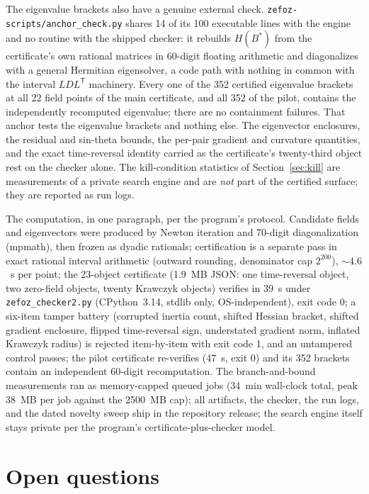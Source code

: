 \documentclass[11pt]{amsart}
\theoremstyle{plain}
\theoremstyle{definition}
\theoremstyle{remark}
\begin{document}
The eigenvalue brackets also have a genuine external check.
\texttt{zefoz-scripts/anchor\_check.py} shares 14 of its 100 executable
lines with the engine and no routine with the shipped checker: it rebuilds
$H(B^{*})$ from the certificate's own rational matrices in 60-digit
floating arithmetic and diagonalizes with a general Hermitian eigensolver,
a code path with nothing in common with the interval $LDL^{\mathsf T}$ machinery.
Every one of the 352 certified eigenvalue brackets at all 22 field points
of the main certificate, and all 352 of the pilot, contains the
independently recomputed eigenvalue; there are no containment failures.
That anchor tests the eigenvalue brackets and nothing else. The
eigenvector enclosures, the residual and sin-theta bounds, the per-pair
gradient and curvature quantities, and the exact time-reversal identity
carried as the certificate's twenty-third object rest on the checker
alone.  The kill-condition statistics of
Section~\ref{sec:kill} are measurements of a private search engine and are
\emph{not} part of the certified surface; they are reported as run logs.

The computation, in one paragraph, per the program's protocol.  Candidate
fields and eigenvectors were produced by Newton iteration and 70-digit
diagonalization (mpmath), then frozen as dyadic rationals; certification is a
separate pass in exact rational interval arithmetic (outward rounding,
denominator cap $2^{200}$), $\sim4.6$~s per point; the 23-object certificate
(1.9~MB JSON: one time-reversal object, two zero-field objects, twenty
Krawczyk objects) verifies in $39$~s under \texttt{zefoz\_checker2.py}
(CPython~3.14, stdlib only, OS-independent), exit code 0; a six-item tamper
battery (corrupted inertia count, shifted Hessian bracket, shifted gradient
enclosure, flipped time-reversal sign, understated gradient norm, inflated
Krawczyk radius) is rejected item-by-item with exit code 1, and an untampered
control passes; the pilot certificate re-verifies (47~s, exit 0) and its 352
brackets contain an independent 60-digit recomputation.  The branch-and-bound
measurements ran as memory-capped queued jobs
(34~min wall-clock total, peak 38~MB per job against the 2500~MB cap); all artifacts, the checker, the run logs, and
the dated novelty sweep ship in the repository release; the search engine
itself stays private per the program's certificate-plus-checker model.

\section{Open questions}\label{sec:open}
\end{document}
